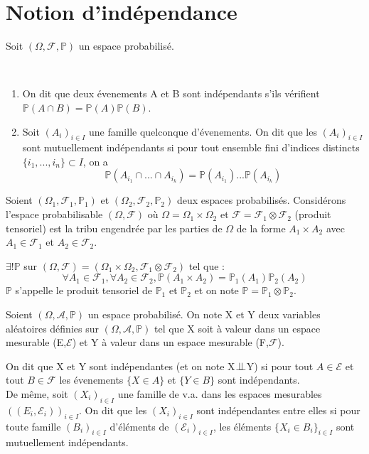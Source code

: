 \section{Notion d'indépendance}
Soit $(\Omega, \mathcal{F}, \mathbb{P})$ un espace probabilisé.

\begin{Def}\
\begin{enumerate}
\item On dit que deux évenements A et B sont indépendants s'ils vérifient $\mathbb{P}(A \cap B) = \mathbb{P}(A) \mathbb{P}(B)$.
\item Soit $(A_i)_{i\in I}$ une famille quelconque d'évenements. On dit que les $(A_i)_{i\in I}$ sont mutuellement indépendants si pour tout ensemble fini d'indices distincts $\{i_1,...,i_n\} \subset I$, on a \[\mathbb{P}(A_{i_1}\cap ... \cap A_{i_k})=\mathbb{P}(A_{i_1}) ... \mathbb{P}(A_{i_k})\]
\end{enumerate}
\end{Def}

Soient $(\Omega_1, \mathcal{F}_1, \mathbb{P}_1)$ et $(\Omega_2, \mathcal{F}_2, \mathbb{P}_2)$ deux espaces probabilisés. Considérons l'espace probabilisable $(\Omega, \mathcal{F})$ où $\Omega = \Omega_1 \times \Omega_2$ et $\mathcal{F}=\mathcal{F}_1 \otimes \mathcal{F}_2$ (produit tensoriel) est la tribu engendrée par les parties de $\Omega$ de la forme $A_1 \times A_2$ avec $A_1 \in \mathcal{F}_1$ et $A_2 \in \mathcal{F}_2$.

\begin{Prop}
$\exists! \mathbb{P}$ sur $(\Omega,\mathcal{F})=(\Omega_1 \times \Omega_2, \mathcal{F}_1 \otimes \mathcal{F}_2)$ tel que : 
\[\forall A_1 \in \mathcal{F}_1, \forall A_2 \in \mathcal{F}_2, \mathbb{P}(A_1 \times A_2)=\mathbb{P}_1(A_1) \mathbb{P}_2(A_2)\]
$\mathbb{P}$ s'appelle le produit tensoriel de $\mathbb{P}_1$ et $\mathbb{P}_2$ et on note $\mathbb{P}=\mathbb{P}_1 \otimes \mathbb{P}_2$.
\end{Prop}

Soient $(\Omega, \mathcal{A}, \mathbb{P})$ un espace probabilisé. On note X et Y deux variables aléatoires définies sur $(\Omega, \mathcal{A}, \mathbb{P})$ tel que X soit à valeur dans un espace mesurable (E,$\mathcal{E}$) et Y à valeur dans un espace mesurable (F,$\mathcal{F}$).

\begin{Def}
On dit que X et Y sont indépendantes (et on note X$\perp \! \! \! \perp$Y) si pour tout $A\in\mathcal{E}$ et tout $B\in\mathcal{F}$ les évenements $\{X\in A\}$ et $\{Y \in B\}$ sont indépendants.\\
De même, soit $(X_i)_{i\in I}$ une famille de v.a. dans les espaces mesurables $((E_i,\mathcal{E}_i))_{i\in I}$. On dit que les $(X_i)_{i\in I}$ sont indépendantes entre elles si pour toute famille $(B_i)_{i \in I}$ d'éléments de $(\mathcal{E}_i)_{i\in I}$, les éléments $\{X_i \in B_i\}_{i\in I}$ sont mutuellement indépendants.
\end{Def}


